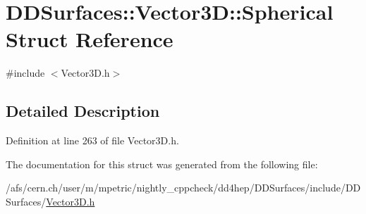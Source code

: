 \hypertarget{struct_d_d_surfaces_1_1_vector3_d_1_1_spherical}{
\section{DDSurfaces::Vector3D::Spherical Struct Reference}
\label{struct_d_d_surfaces_1_1_vector3_d_1_1_spherical}
}


{\ttfamily \#include $<$Vector3D.h$>$}

\subsection{Detailed Description}


Definition at line 263 of file Vector3D.h.

The documentation for this struct was generated from the following file:\begin{DoxyCompactItemize}
\item 
/afs/cern.ch/user/m/mpetric/nightly\_\-cppcheck/dd4hep/DDSurfaces/include/DDSurfaces/\hyperlink{_vector3_d_8h}{Vector3D.h}\end{DoxyCompactItemize}
